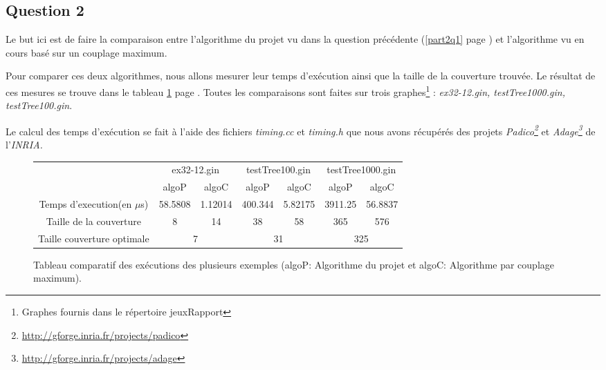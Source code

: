   \subsection{Question 2}
  Le but ici est de faire la comparaison entre l'algorithme du projet vu
  dans la question précédente (\ref{part2q1} page \pageref{part2q1}) et
  l'algorithme vu en cours basé sur un couplage maximum.

  Pour comparer ces deux algorithmes, nous allons mesurer leur temps
  d'exécution ainsi que la taille de la couverture trouvée. Le résultat
  de ces mesures se trouve dans le tableau \ref{tableau} page
  \pageref{tableau}. Toutes les comparaisons sont faites sur trois
  graphes\footnote{Graphes fournis dans le répertoire jeuxRapport} :
  \emph{ex32-12.gin, testTree1000.gin, testTree100.gin}.

  Le calcul des temps d'exécution se fait à l'aide des fichiers
  \emph{timing.cc} et \emph{timing.h} que nous avons récupérés des
  projets
  \emph{Padico\footnote{\url{http://gforge.inria.fr/projects/padico}}} 
  et \emph{Adage\footnote{\url{http://gforge.inria.fr/projects/adage}}}
  de l'\emph{INRIA.}
 
  \begin{figure}[!ht]
   \begin{center}
    \begin{tabular}{|c|c|c||c|c||c|c|}
     \cline{2-7}
     \multicolumn{1}{c|}{} & \multicolumn{2}{|c||}{ex32-12.gin}
     &\multicolumn{2}{|c||}{testTree100.gin} &
     \multicolumn{2}{|c|}{testTree1000.gin}\\ 
     \cline{2-7}
     \multicolumn{1}{c|}{} & algoP & algoC & algoP & algoC & algoP &
     algoC\\
     \hline
     Temps d'execution(en $\mu$s) & 58.5808 & 1.12014 & 400.344 &
     5.82175 & 3911.25 & 56.8837\\
     \hline
     Taille de la couverture & 8 & 14 & 38 & 58 & 365 & 576\\
     \hline
     Taille couverture optimale & \multicolumn{2}{|c||}{7} &
		 \multicolumn{2}{|c||}{31} &
     \multicolumn{2}{|c||}{325}\\ 
     \hline
    \end{tabular}
    \caption{Tableau comparatif des exécutions des plusieurs
    exemples (algoP: Algorithme du projet et algoC: Algorithme par
    couplage maximum).\label{tableau}} 
   \end{center}
  \end{figure}  

